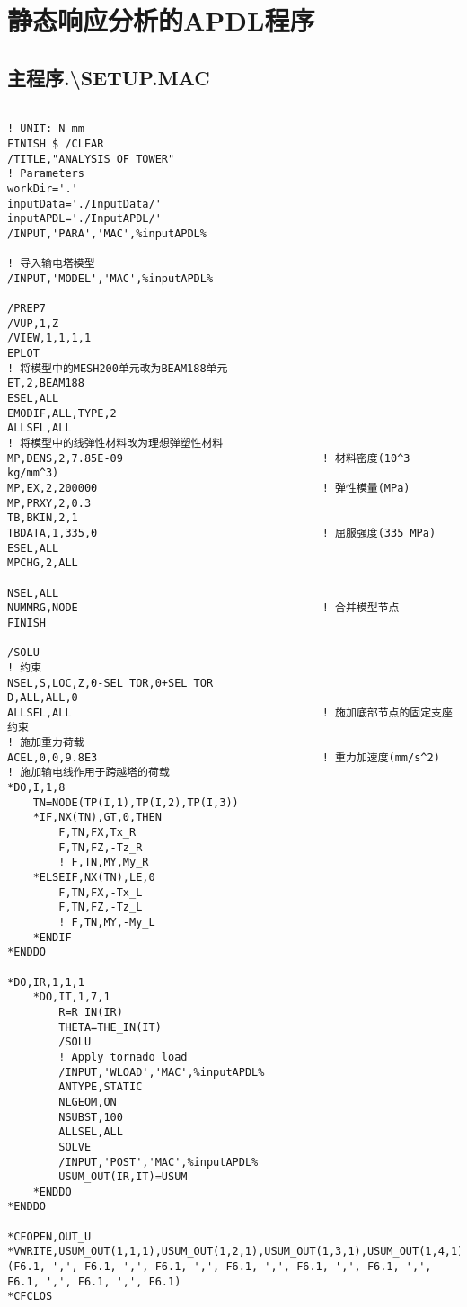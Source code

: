 \chapter{静态响应分析的APDL程序}\label{apen:static}

\section{主程序.\textbackslash{}SETUP.MAC}

\begin{verbatim}

! UNIT: N-mm
FINISH $ /CLEAR
/TITLE,"ANALYSIS OF TOWER"
! Parameters
workDir='.'
inputData='./InputData/'
inputAPDL='./InputAPDL/'
/INPUT,'PARA','MAC',%inputAPDL%

! 导入输电塔模型
/INPUT,'MODEL','MAC',%inputAPDL%

/PREP7
/VUP,1,Z
/VIEW,1,1,1,1
EPLOT
! 将模型中的MESH200单元改为BEAM188单元
ET,2,BEAM188
ESEL,ALL
EMODIF,ALL,TYPE,2
ALLSEL,ALL
! 将模型中的线弹性材料改为理想弹塑性材料
MP,DENS,2,7.85E-09                               ! 材料密度(10^3 kg/mm^3)
MP,EX,2,200000                                   ! 弹性模量(MPa)
MP,PRXY,2,0.3
TB,BKIN,2,1
TBDATA,1,335,0                                   ! 屈服强度(335 MPa)
ESEL,ALL
MPCHG,2,ALL

NSEL,ALL
NUMMRG,NODE                                      ! 合并模型节点
FINISH

/SOLU
! 约束
NSEL,S,LOC,Z,0-SEL_TOR,0+SEL_TOR
D,ALL,ALL,0
ALLSEL,ALL                                       ! 施加底部节点的固定支座约束
! 施加重力荷载
ACEL,0,0,9.8E3                                   ! 重力加速度(mm/s^2)
! 施加输电线作用于跨越塔的荷载
*DO,I,1,8
    TN=NODE(TP(I,1),TP(I,2),TP(I,3))
    *IF,NX(TN),GT,0,THEN
        F,TN,FX,Tx_R
        F,TN,FZ,-Tz_R
        ! F,TN,MY,My_R
    *ELSEIF,NX(TN),LE,0
        F,TN,FX,-Tx_L
        F,TN,FZ,-Tz_L
        ! F,TN,MY,-My_L
    *ENDIF
*ENDDO

*DO,IR,1,1,1
    *DO,IT,1,7,1
        R=R_IN(IR)
        THETA=THE_IN(IT)
        /SOLU
        ! Apply tornado load
        /INPUT,'WLOAD','MAC',%inputAPDL%
        ANTYPE,STATIC
        NLGEOM,ON
        NSUBST,100
        ALLSEL,ALL
        SOLVE
        /INPUT,'POST','MAC',%inputAPDL%
        USUM_OUT(IR,IT)=USUM
    *ENDDO
*ENDDO

*CFOPEN,OUT_U
*VWRITE,USUM_OUT(1,1,1),USUM_OUT(1,2,1),USUM_OUT(1,3,1),USUM_OUT(1,4,1),USUM_OUT(1,5,1),USUM_OUT(1,6,1),USUM_OUT(1,7,1)
(F6.1, ',', F6.1, ',', F6.1, ',', F6.1, ',', F6.1, ',', F6.1, ',', F6.1, ',', F6.1, ',', F6.1)
*CFCLOS


\end{verbatim}

